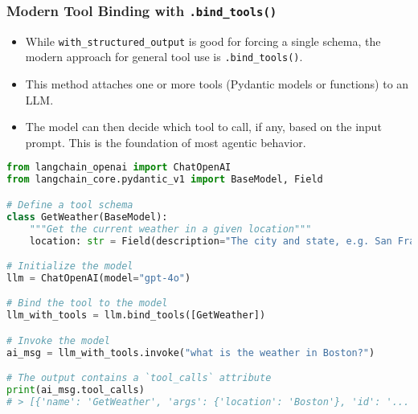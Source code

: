 \begin{frame}[fragile]\frametitle{Modern Tool Binding with \texttt{.bind\_tools()}}
      \begin{itemize}
        \item While \texttt{with\_structured\_output} is good for forcing a single schema, the modern approach for general tool use is \texttt{.bind\_tools()}.
        \item This method attaches one or more tools (Pydantic models or functions) to an LLM.
        \item The model can then decide which tool to call, if any, based on the input prompt. This is the foundation of most agentic behavior.
      \end{itemize}
\begin{lstlisting}[language=Python, basicstyle=\tiny]
from langchain_openai import ChatOpenAI
from langchain_core.pydantic_v1 import BaseModel, Field

# Define a tool schema
class GetWeather(BaseModel):
    """Get the current weather in a given location"""
    location: str = Field(description="The city and state, e.g. San Francisco, CA")

# Initialize the model
llm = ChatOpenAI(model="gpt-4o")

# Bind the tool to the model
llm_with_tools = llm.bind_tools([GetWeather])

# Invoke the model
ai_msg = llm_with_tools.invoke("what is the weather in Boston?")

# The output contains a `tool_calls` attribute
print(ai_msg.tool_calls)
# > [{'name': 'GetWeather', 'args': {'location': 'Boston'}, 'id': '...'}]]
\end{lstlisting}
\end{frame}

